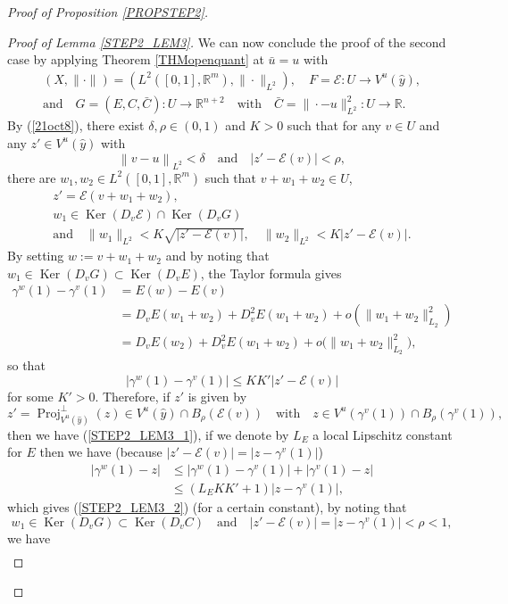 \documentclass[JEP,XML,SOM,Unicode,NoFloatCountersInSection,published]{cedram}
\DeclareMathOperator{\Ker}{Ker}
\DeclareMathOperator{\Proj}{Proj}
\newcommand\R{\mathbb R}
\theoremstyle{definition}
\begin{document}
\begin{proof}[Proof of Proposition \ref{PROPSTEP2}]
\begin{proof}[Proof of Lemma \ref{STEP2_LEM3}]
We can now conclude the proof of the second case by applying Theorem \ref{THMopenquant} at $\bar{u}=u$ with
\begin{gather*}
(X,\|\cdot\|)=\left(L^2([0,1],\R^m),\|\cdot\|_{L^2}\right), \quad F=\mathcal{E}:U \to V^u(\hat{y}),
\\
\text{and} \quad G=(E,C,\bar{C}): U \to \R^{n+2} \quad \text{with} \quad \bar{C}=\|\cdot-u\|_{L^2}^2: U \to \R.
\end{gather*}
By (\ref{21oct8}), there exist $\delta, \rho\in (0,1) $ and $K>0$ such that for any $v \in U$ and any $z'\in V^u(\hat{y})$ with
\[
\left\| v - u\right\|_{L^2} < \delta \quad \text{and} \quad |z'-\mathcal{E}(v)|<\rho,
\]
there are $w_1, w_2 \in L^2([0,1],\R^m)$ such that $v+w_1+w_2 \in U$,
\begin{gather*}
z'=\mathcal{E}(v+w_1+w_2),
\\
w_1 \in \Ker\left(D_v\mathcal{E}\right) \cap \Ker\left(D_vG\right)
\\
\text{and} \quad \|w_1\|_{L^2}<K \sqrt{|z'-\mathcal{E}(v)|}, \quad \|w_2\|_{L^2}<K |z'-\mathcal{E}(v)|.
\end{gather*}
By setting $w:=v+w_1+w_2$ and by noting that $w_1 \in \Ker(D_vG)\subset \Ker(D_vE)$, the Taylor formula gives
\begin{align*}
\gamma^w(1)-\gamma^v(1) & = E(w)-E(v) \\
& = D_vE (w_1+w_2) + D^2_vE(w_1+w_2) + o \left(\|w_1+w_2\|_{L_2}^2\right)\\
& =  D_vE (w_2) + D^2_vE(w_1+w_2) + o \bigl(\|w_1+w_2\|_{L_2}^2\bigr),
\end{align*}
so that
\[
\left| \gamma^w(1)-\gamma^v(1) \right| \leq KK'|z'-\mathcal{E}(v)|
\]
for some $K'>0$. Therefore, if $z'$ is given by
\[
z' = \Proj_{V^{u}(\hat{y})}^{\perp} (z) \in V^u(\hat{y}) \cap B_{\rho}(\mathcal{E}(v)) \quad \text{with} \quad z \in V^{u}(\gamma^v(1)) \cap B_{\rho}(\gamma^v(1)),
\]
then we have (\ref{STEP2_LEM3_1}), if we denote by $L_E$ a local Lipschitz constant for $E$ then we have (because $|z'-\mathcal{E}(v)|=|z-\gamma^v(1)|$)
\begin{align*}
\left| \gamma^w(1)-z \right| & \leq  \left| \gamma^w(1)-\gamma^v(1) \right| + |\gamma^v(1)-z| \\
& \leq  (L_EKK'+1) |z -\gamma^v(1)|,
\end{align*}
which gives (\ref{STEP2_LEM3_2}) (for a certain constant), by noting that
\[
w_1 \in \Ker(D_vG)\subset \Ker(D_vC) \quad \text{and} \quad |z'-\mathcal{E}(v)|=|z-\gamma^v(1)|<\rho < 1,
\]
we have
\begin{align*}

\end{align*}
\end{proof}
\end{proof}
\end{document}
